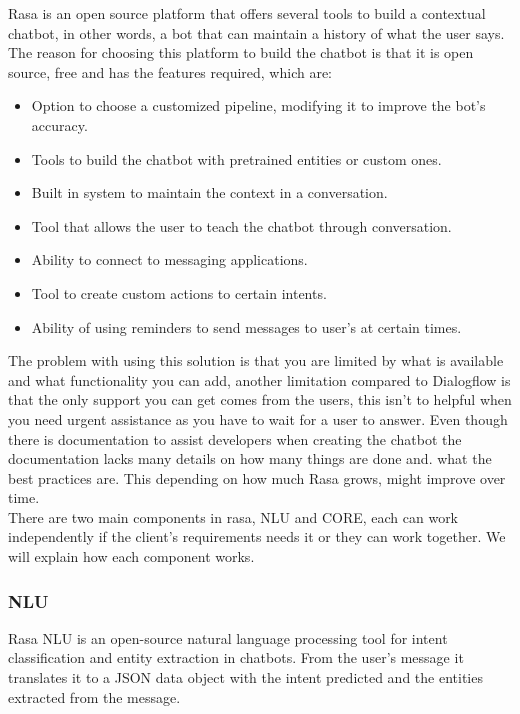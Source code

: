 Rasa is an open source platform that offers several tools to build a contextual chatbot, in other words, a bot that can maintain a history of what the user says.\\
The reason for choosing this platform to build the chatbot is that it is open source, free and has the features required, which are:

\begin{itemize}
	\item Option to choose a customized pipeline, modifying it to improve the bot’s accuracy.
	\item Tools to build the chatbot with pretrained entities or custom ones.
	\item Built in system to maintain the context in a conversation.
	\item Tool that allows the user to teach the chatbot through conversation.
	\item Ability to connect to messaging applications.
	\item Tool to create custom actions to certain intents.
	\item Ability of using reminders to send messages to user’s at certain times.
\end{itemize}
	
The problem with using this solution is that you are limited by what is available and what functionality you can add, another limitation compared to Dialogflow is that the only support you can get comes from the users, this isn’t to helpful when you need urgent assistance as you have to wait for a user to answer. Even though there is documentation to assist developers when creating the chatbot the documentation lacks many details on how many things are done and. what the best practices are. This depending on how much Rasa grows, might improve over time.\\
There are two main components in rasa, NLU and CORE, each can work independently if the client’s requirements needs it or they can work together. We will explain how each component works.\cite{rasa}

\subsubsection{NLU}\label{sec:chap3_rasa_nlu}

Rasa NLU is an open-source natural language processing tool for intent classification and entity extraction in chatbots.  From the user’s message it translates it to a JSON data object with the intent predicted and the entities extracted from the message.\\

